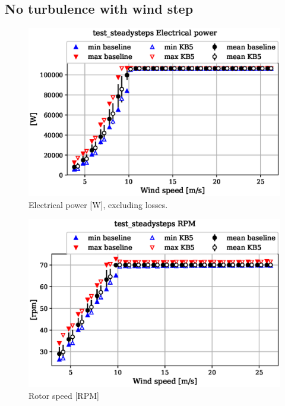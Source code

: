 
\subsection{No turbulence with wind step}
\label{sec:baseline-vs-KB6:test_steadysteps}

\begin{figure}[!ht]
\begin{center}
	\includegraphics[width=.85\linewidth]{figures/baseline-vs-KB6/test_steadysteps/DLL-generator_servo-inpvec-2_AA0008_AA0008.eps}
\end{center}
\caption{Electrical power [W], excluding losses.}
\label{fig:baseline-vs-KB6:test_steadysteps:power}
\end{figure}

\begin{figure}[!ht]
\begin{center}
	\includegraphics[width=.85\linewidth]{figures/baseline-vs-KB6/test_steadysteps/bearing-shaft_rot-angle_speed-rpm_AA0008_AA0008.eps}
\end{center}
\caption{Rotor speed [RPM]}
\label{fig:baseline-vs-KB6:test_steadysteps:rpm}
\end{figure}

